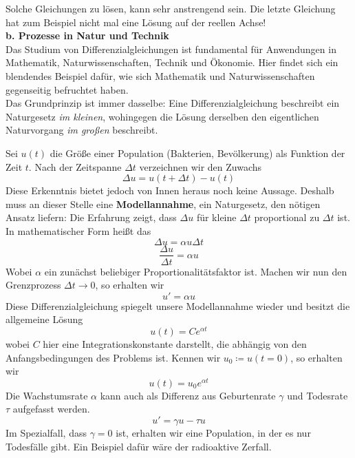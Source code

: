 Solche Gleichungen zu lösen, kann sehr anstrengend sein. 
Die letzte Gleichung hat zum Beispiel nicht mal eine Lösung 
auf der reellen Achse!\\
\linebreak
\textbf{b. Prozesse in Natur und Technik}\\
\linebreak
Das Studium von Differenzialgleichungen ist fundamental für 
Anwendungen in Mathematik, Naturwissenschaften, Technik und 
Ökonomie. Hier findet sich ein blendendes Beispiel dafür, 
wie sich Mathematik und Naturwissenschaften gegenseitig 
befruchtet haben. \\
Das Grundprinzip ist immer dasselbe: Eine Differenzialgleichung 
beschreibt ein Naturgesetz \emph{im kleinen}, wohingegen die 
Lösung derselben den eigentlichen Naturvorgang \emph{im großen} 
beschreibt.\\
\linebreak
\begin{beispiel}
Sei $u(t)$ die Größe einer Population (Bakterien, Bevölkerung) 
als Funktion der Zeit $t$. Nach der Zeitspanne $\Delta t$ 
verzeichnen wir den Zuwachs
\begin{equation*}
\Delta u = u(t+\Delta t) - u(t)
\end{equation*}
Diese Erkenntnis bietet jedoch von Innen heraus noch keine 
Aussage. Deshalb muss an dieser Stelle eine 
 \textbf{Modellannahme}, ein Naturgesetz, den nötigen Ansatz 
liefern: Die Erfahrung zeigt, dass $\Delta u$ für kleine 
$\Delta t$ proportional zu $\Delta t$ ist. \\
In mathematischer Form heißt das 
\begin{equation*}
\Delta u=\alpha u \Delta t
\end{equation*}
\begin{equation*}
\frac{\Delta u}{ \Delta t}
=\alpha u
\end{equation*}
Wobei $\alpha$ ein zunächst beliebiger Proportionalitätsfaktor 
ist. Machen wir nun den Grenzprozess $\Delta t \rightarrow 0$, so erhalten wir 
\begin{equation*}
u'=\alpha u
\end{equation*}
Diese Differenzialgleichung spiegelt unsere Modellannahme wieder 
und besitzt die allgemeine Lösung
\begin{equation*}
u(t)=Ce^{\alpha t}
\end{equation*}
wobei $C$ hier eine Integrationskonstante darstellt, die 
abhängig von den Anfangsbedingungen des Problems ist. Kennen 
wir $u_0\coloneqq u(t=0)$, so erhalten wir
\begin{equation*}
u(t)=u_0e^{\alpha t}
\end{equation*}
Die Wachstumsrate $\alpha$ kann auch als Differenz aus 
Geburtenrate $\gamma$ und Todesrate $\tau$ aufgefasst werden. 
\begin{equation*}
u'=\gamma u -\tau u
\end{equation*}
Im Spezialfall, dass $\gamma=0$ ist, erhalten wir eine 
Population, in der es nur Todesfälle gibt. Ein Beispiel 
dafür wäre der radioaktive Zerfall.
\end{beispiel}

